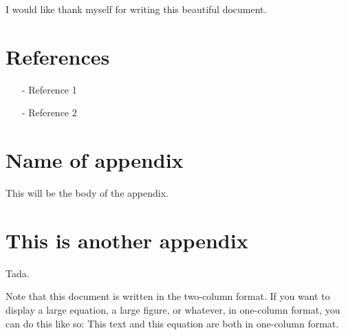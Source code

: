 \documentclass[reprint,english,notitlepage]{revtex4-2}
\begin{document}
\begin{acknowledgments}
I would like thank myself for writing this beautiful document.
\end{acknowledgments}


\section*{References}  %
\begin{itemize}
\item[-]Reference 1
\item[-]Reference 2
\end{itemize}

\newpage
\appendix
\section{Name of appendix}
This will be the body of the appendix.
\section{This is another appendix}\label{appendix}
Tada.


\clearpage
Note that this document is written in the two-column format. If you want to display a large equation, a large figure, or whatever, in one-column format, you can do this like so:
\onecolumngrid
\vspace{1cm} %
This text and this equation are both in one-column format.
\end{document}

